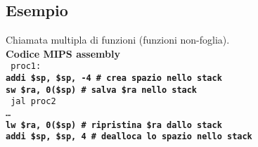 \documentclass[../main.tex]{subfiles}
\begin{document}
\subsection*{Esempio}
Chiamata multipla di funzioni (funzioni non-foglia).
\\[5mm]
\textbf{Codice MIPS assembly} \\
\texttt{
    proc1: \\
    \textbf{
        \hspace*{0cm} \hspace*{0cm} \hspace*{0cm} \hspace*{0cm} addi \$sp, \$sp, -4 \hspace*{0cm} \# crea spazio nello stack \\
        \hspace*{0cm} \hspace*{0cm} \hspace*{0cm} \hspace*{0cm} sw \$ra, 0(\$sp) \hspace*{0cm} \hspace*{0cm} \hspace*{0cm} \hspace*{0cm} \# salva \$ra nello stack \\
    }
    \hspace*{0cm} \hspace*{0cm} \hspace*{0cm} \hspace*{0cm} jal proc2 \\
    \hspace*{0cm} \hspace*{0cm} \hspace*{0cm} \hspace*{0cm} \dots \\
    \textbf{
        \hspace*{0cm} \hspace*{0cm} \hspace*{0cm} \hspace*{0cm} lw \$ra, 0(\$sp) \hspace*{0cm} \hspace*{0cm} \hspace*{0cm} \hspace*{0cm} \# ripristina \$ra dallo stack \\
        \hspace*{0cm} \hspace*{0cm} \hspace*{0cm} \hspace*{0cm} addi \$sp, \$sp, 4 \hspace*{0cm} \hspace*{0cm} \# dealloca lo spazio nello stack \\
}}
\end{document}

